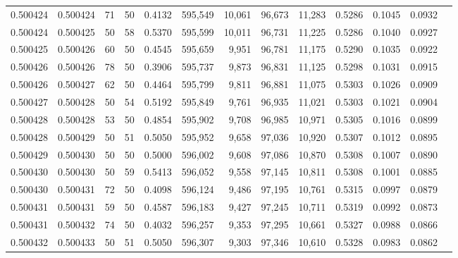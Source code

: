 \begin{tabular}{rrrrrrrrrrrrr}
0.500424 & 0.500424 &    71 &  50 &                                     0.4132 & 595,549 &  10,061 &  96,673 &  11,283 & 0.5286 & 0.1045 & 0.0932 \\
0.500424 & 0.500425 &    50 &  58 &                                     0.5370 & 595,599 &  10,011 &  96,731 &  11,225 & 0.5286 & 0.1040 & 0.0927 \\
0.500425 & 0.500426 &    60 &  50 &                                     0.4545 & 595,659 &   9,951 &  96,781 &  11,175 & 0.5290 & 0.1035 & 0.0922 \\
0.500426 & 0.500426 &    78 &  50 &                                     0.3906 & 595,737 &   9,873 &  96,831 &  11,125 & 0.5298 & 0.1031 & 0.0915 \\
0.500426 & 0.500427 &    62 &  50 &                                     0.4464 & 595,799 &   9,811 &  96,881 &  11,075 & 0.5303 & 0.1026 & 0.0909 \\
0.500427 & 0.500428 &    50 &  54 &                                     0.5192 & 595,849 &   9,761 &  96,935 &  11,021 & 0.5303 & 0.1021 & 0.0904 \\
0.500428 & 0.500428 &    53 &  50 &                                     0.4854 & 595,902 &   9,708 &  96,985 &  10,971 & 0.5305 & 0.1016 & 0.0899 \\
0.500428 & 0.500429 &    50 &  51 &                                     0.5050 & 595,952 &   9,658 &  97,036 &  10,920 & 0.5307 & 0.1012 & 0.0895 \\
0.500429 & 0.500430 &    50 &  50 &                                     0.5000 & 596,002 &   9,608 &  97,086 &  10,870 & 0.5308 & 0.1007 & 0.0890 \\
0.500430 & 0.500430 &    50 &  59 &                                     0.5413 & 596,052 &   9,558 &  97,145 &  10,811 & 0.5308 & 0.1001 & 0.0885 \\
0.500430 & 0.500431 &    72 &  50 &                                     0.4098 & 596,124 &   9,486 &  97,195 &  10,761 & 0.5315 & 0.0997 & 0.0879 \\
0.500431 & 0.500431 &    59 &  50 &                                     0.4587 & 596,183 &   9,427 &  97,245 &  10,711 & 0.5319 & 0.0992 & 0.0873 \\
0.500431 & 0.500432 &    74 &  50 &                                     0.4032 & 596,257 &   9,353 &  97,295 &  10,661 & 0.5327 & 0.0988 & 0.0866 \\
0.500432 & 0.500433 &    50 &  51 &                                     0.5050 & 596,307 &   9,303 &  97,346 &  10,610 & 0.5328 & 0.0983 & 0.0862 \\

\end{tabular}
